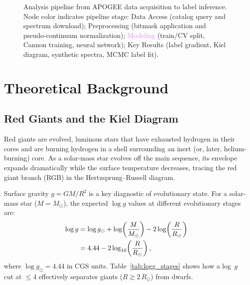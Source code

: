 \documentclass[10pt,preprint2]{aastex}
\begin{document}
\begin{figure}[t!]
{%
  }
  \caption{Analysis pipeline from APOGEE data acquisition to label inference. Node color indicates pipeline stage: \textcolor{blue!70!black}{Data Access} (catalog query and spectrum download); \textcolor{cyan!60!black}{Preprocessing} (bitmask application and pseudo-continuum normalization); \textcolor{violet}{Modeling} (train/CV split, Cannon training, neural network); \textcolor{red!60!black}{Key Results} (label gradient, Kiel diagram, synthetic spectra, MCMC label fit).}
  \label{fig:pipeline}
\end{figure}

\section{Theoretical Background}
\label{sec:theory}

\subsection{Red Giants and the Kiel Diagram}

Red giants are evolved, luminous stars that have exhausted hydrogen in their cores and are burning hydrogen in a shell surrounding an inert (or, later, helium-burning) core. As a solar-mass star evolves off the main sequence, its envelope expands dramatically while the surface temperature decreases, tracing the red giant branch (RGB) in the Hertzsprung--Russell diagram.

Surface gravity $g = GM/R^2$ is a key diagnostic of evolutionary state. For a solar-mass star ($M = M_\odot$), the expected $\log g$ values at different evolutionary stages are:
\begin{align}
  \log g &= \log g_\odot + \log\!\left(\frac{M}{M_\odot}\right) - 2\log\!\left(\frac{R}{R_\odot}\right) \notag \\
         &= 4.44 - 2\log_{10}\!\left(\frac{R}{R_\odot}\right),
  \label{eq:logg}
\end{align}
where $\log g_\odot = 4.44$ in CGS units. Table~\ref{tab:logg_stages} shows how a log~$g$ cut at $\leq 4$ effectively separates giants ($R \gtrsim 2\,R_\odot$) from dwarfs.
\end{document}
